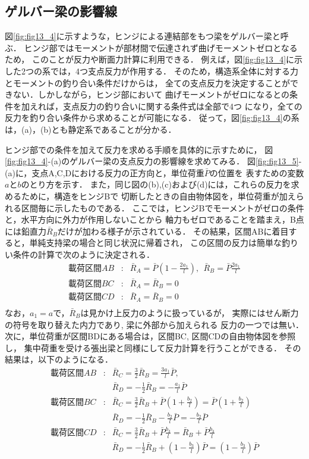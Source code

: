 \documentclass[10pt,a4j]{jarticle}
\begin{document}
\subsection{ゲルバー梁の影響線}
図\ref{fig:fig13_4}に示すような，ヒンジによる連結部をもつ梁をゲルバー梁と呼ぶ．
ヒンジ部ではモーメントが部材間で伝達されず曲げモーメントゼロとなるため，
このことが反力や断面力計算に利用できる．
例えば，図\ref{fig:fig13_4}に示した2つの系では，4つ支点反力が作用する．
そのため，構造系全体に対する力とモーメントの釣り合い条件だけからは，
全ての支点反力を決定することができない．しかしながら，ヒンジ部において
曲げモーメントがゼロになるとの条件を加えれば，支点反力の釣り合いに関する条件式は全部で4つ
になり，全ての反力を釣り合い条件から求めることが可能になる．
従って，図\ref{fig:fig13_4}の系は，(a)，(b)とも静定系であることが分かる．


ヒンジ部での条件を加えて反力を求める手順を具体的に示すために，
図\ref{fig:fig13_4}-(a)のゲルバー梁の支点反力の影響線を求めてみる．
図\ref{fig:fig13_5}-(a)に，支点A,C,Dにおける反力の正方向と，単位荷重$\bar{P}$の位置を
表すための変数$a$と$b$のとり方を示す．
また，同じ図の(b),(c)および(d)には，これらの反力を求めるために，構造をヒンジBで
切断したときの自由物体図を，単位荷重が加えられる区間毎に示したものである．
ここでは，ヒンジBでモーメントがゼロの条件と，水平方向に外力が作用しないことから
軸力もゼロであることを踏まえ，B点には鉛直力$\bar{R}_B$だけが加わる様子が示されている．
その結果，区間ABに着目すると，単純支持梁の場合と同じ状況に帰着され，
この区間の反力は簡単な釣りい条件の計算で次のように決定される．
\begin{eqnarray}
	載荷区間AB &:& 
	\bar{R}_A=\bar{P} \left( 1-\frac{2a_1}{l} \right), \ \ 
	\bar{R}_B=\bar{P} \frac{2a_1}{l} \\ 
	載荷区間BC &:& 
	\bar{R}_A=\bar{R}_B=0 \\ 
	載荷区間CD &:& 
	\bar{R}_A=\bar{R}_B=0 \\ 
\end{eqnarray}
なお，$a_1=a$で，$\bar{R}_B$は見かけ上反力のように扱っているが，
実際にはせん断力の符号を取り替えた内力であり, 梁に外部から加えられる
反力の一つでは無い．
次に，単位荷重が区間BDにある場合は，区間BC, 区間CDの自由物体図を参照し，
集中荷重を受ける張出梁と同様にして反力計算を行うことができる．
その結果は，以下のようになる．
\begin{eqnarray}
	載荷区間AB &: & 
	\bar{R}_C=\frac{3}{2} \bar{R}_B=\frac{3a_1}{l}\bar{P}, 
	\\
	&&
	\bar{R}_D=-\frac{1}{2} \bar{R}_B=-\frac{a_1}{l}\bar{P}
	\\
	載荷区間BC &: & 
	\bar{R}_C=\frac{3}{2} \bar{R}_B+\bar{P}\left(1+\frac{b_2}{l}\right)
	=\bar{P}\left(1+\frac{b_2}{l}\right)
	\\
	&&
	\bar{R}_D=-\frac{1}{2} \bar{R}_B-\frac{b_2}{l}\bar{P}
	=-\frac{b_2}{l}\bar{P}
	\\
	載荷区間CD &: & 
	\bar{R}_C=\frac{3}{2} \bar{R}_B+\bar{P}\frac{b_3}{l}
	=\bar{R}_B+\bar{P}\frac{b_3}{l}
	\\
	&&
	\bar{R}_D=-\frac{1}{2} \bar{R}_B+\left(1-\frac{b_3}{l}\right)\bar{P}
	=
	\left(1-\frac{b_3}{l}\right)\bar{P}
\end{eqnarray}
\end{document}
